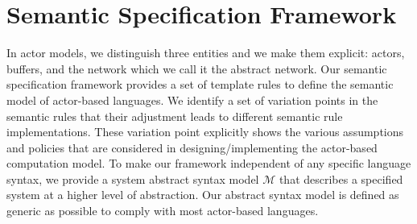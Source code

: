 \section{Semantic Specification Framework}\label{sec::generic}
In actor models, we distinguish three entities and we make them explicit: actors, buffers, and the network which we call it the abstract network. Our semantic specification framework provides a set of template rules to define the semantic model of actor-based languages. We identify a set of variation points in the semantic rules that their adjustment leads to different semantic rule implementations. These variation point explicitly shows the various assumptions and policies that are considered in designing/implementing the actor-based computation model. %
To make our framework independent of any specific language syntax, we provide a system abstract syntax model $\mathcal{M}$ that describes a specified system at a higher level of abstraction. Our abstract syntax model is defined as generic as possible to comply with most actor-based languages.

